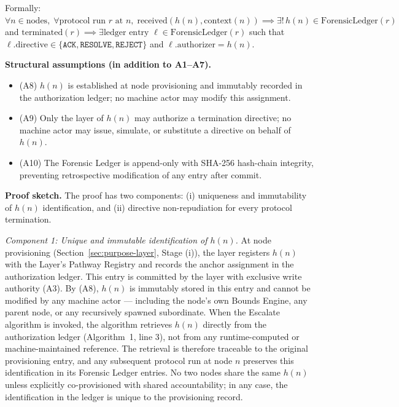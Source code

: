 \bigskip
\noindent
Formally: $\forall n \in \text{nodes},\; \forall \text{protocol run } r \text{ at } n,\; \text{received}(h(n), \text{context}(n)) \implies \exists!\, h(n) \in \text{ForensicLedger}(r)$ and $\text{terminated}(r) \implies \exists \text{ledger entry } \ell \in \text{ForensicLedger}(r)$ such that $\ell.\text{directive} \in \{\texttt{ACK}, \texttt{RESOLVE}, \texttt{REJECT}\}$ and $\ell.\text{authorizer} = h(n)$.

\bigskip
\noindent
\textbf{Structural assumptions (in addition to A1–A7).}
\begin{itemize}\itemsep=0pt
\item[\namedlabel{asm:immutable-anchor}]{(A8)} $h(n)$ is established at node provisioning and immutably recorded in the authorization ledger; no machine actor may modify this assignment.
\item[\namedlabel{asm:directive-exclusivity}]{(A9)} Only the \purpose{} layer of $h(n)$ may authorize a termination directive; no machine actor may issue, simulate, or substitute a directive on behalf of $h(n)$.
\item[\namedlabel{asm:ledger-immutability}]{(A10)} The Forensic Ledger is append-only with SHA-256 hash-chain integrity, preventing retrospective modification of any entry after commit.
\end{itemize}

\bigskip
\noindent
\textbf{Proof sketch.} The proof has two components: (i) uniqueness and immutability of $h(n)$ identification, and (ii) directive non-repudiation for every protocol termination.

\medskip
\noindent
\textit{Component 1: Unique and immutable identification of $h(n)$.} At node provisioning (Section~\ref{sec:purpose-layer}, Stage (i)), the \purpose{} layer registers $h(n)$ with the \fact{} Layer's Pathway Registry and records the anchor assignment in the authorization ledger. This entry is committed by the \fact{} layer with exclusive write authority (A3). By (A8), $h(n)$ is immutably stored in this entry and cannot be modified by any machine actor — including the node's own Bounds Engine, any parent node, or any recursively spawned subordinate. When the Escalate algorithm is invoked, the algorithm retrieves $h(n)$ directly from the authorization ledger (Algorithm~1, line 3), not from any runtime-computed or machine-maintained reference. The retrieval is therefore traceable to the original provisioning entry, and any subsequent protocol run at node $n$ preserves this identification in its Forensic Ledger entries. No two nodes share the same $h(n)$ unless explicitly co-provisioned with shared accountability; in any case, the identification in the ledger is unique to the provisioning record.


